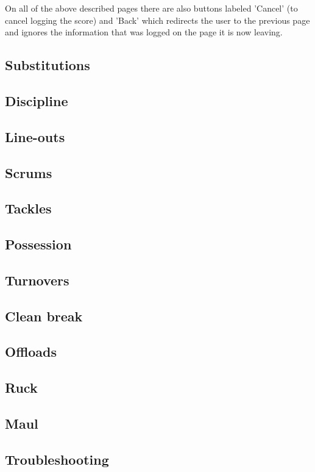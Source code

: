 \documentclass[hidelinks,a4paper,12pt]{article}
\begin{document}
	On all of the above described pages there are also buttons labeled 'Cancel' (to cancel logging the score) and 'Back' which redirects the user to the previous page and ignores the information that was logged on the page it is now leaving.

	\subsection{Substitutions}
	
	\subsection{Discipline}

	\subsection{Line-outs}

	\subsection{Scrums}

	\subsection{Tackles}

	\subsection{Possession}

	\subsection{Turnovers}

	\subsection{Clean break}

	\subsection{Offloads}

	\subsection{Ruck}

	\subsection{Maul}

\subsection{Troubleshooting}
		
\end{document}
